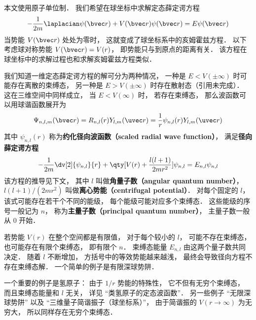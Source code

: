 

本文使用原子单位制． 我们希望在球坐标中求解定态薛定谔方程
\begin{equation}\label{RadSE_eq2}
-\frac{1}{2m}\laplacian \psi(\bvec r) + V(\bvec r)\psi(\bvec r) = E\psi(\bvec r)
\end{equation}
当势能 $V(\bvec r)$ 处处为零时， 这就变成了球坐标系中的亥姆霍兹方程． 以下考虑球对称势能 $V(\bvec r) = V(r)$， 即势能只与到原点的距离有关． 该方程在球坐标中的求解过程也和求解亥姆霍兹方程类似．

我们知道一维定态薛定谔方程的解可分为两种情况， 一种是 $E < V(\pm\infty)$ 时可能存在离散的束缚态， 另一种是 $E > V(\pm\infty)$ 时存在散射态（引用未完成）． 这在三维空间中同样成立， 当 $E < V(\infty)$ 时， 若存在束缚态， 那么波函数可以用球谐函数展开为
\begin{equation}\label{RadSE_eq4}
\Psi_{n, l,m}(\bvec r) = R_{n, l}(r) Y_{l,m}(\uvec r) = \frac{1}{r}\psi_{n, l}(r) Y_{l,m}(\uvec r)
\end{equation}
其中 $\psi_{n, l}(r)$ 称为\textbf{约化径向波函数（scaled radial wave function）}， 满足\textbf{径向薛定谔方程}
\begin{equation}\label{RadSE_eq1}
-\frac{1}{2m} \dv[2]{\psi_{n, l}}{r} + \qty[V(r) + \frac{l(l + 1)}{2mr^2}]\psi_{n, l} = E_{n, l} \psi_{n, l}
\end{equation}
该方程的推导见下文， 其中 $l$ 叫做\textbf{角量子数（angular quantum number）}， $l(l + 1)/(2mr^2)$ 叫做\textbf{离心势能（centrifugal potential）}． 对每个固定的 $l$， 该式可能存在若干个不同的能级， 每个能级可能对应多个束缚态． 这些能级的序号一般记为 $n$， 称为\textbf{主量子数（principal quantum number）}， 主量子数一般从 0 开始．

若势能 $V(r)$ 在整个空间都是有限值， 对于每个较小的 $l$， 可能不存在束缚态， 也可能存在有限个束缚态， 即有限个 $n$． 束缚态能量 $E_{n,l}$ 由这两个量子数共同决定． 随着 $l$ 不断增加， 方括号中的等效势能越来越浅， 最终会导致径向方程不存在束缚态解． 一个简单的例子是有限深球势阱．

一个重要的例子是氢原子： 由于 $1/r$ 势能的特殊性， 它不但有无穷个束缚态， 而且束缚态能量和 $l$ 无关， 详见 “类氢原子的定态波函数”． 另一些例子 “无限深球势阱” 以及 “三维量子简谐振子（球坐标系）”， 由于简谐振的 $V(r\to \infty)$ 为无穷大， 所以同样存在无穷个束缚态．


